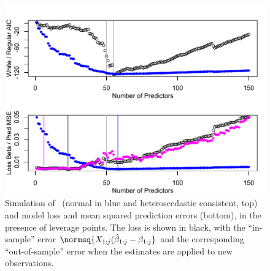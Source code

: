 \documentclass[12pt]{article}
\begin{document}
 \begin{figure}
 \caption{ Simulation of \aic\ (normal in blue and heteroscedastic consistent,
 top) and model loss and mean squared prediction errors (bottom), in the
 presence of leverage points.  The loss is shown in black, with the
 ``in-sample'' error $\normsq{X_{1:j}(\hat\beta_{1:j}-\beta_{1:j}}$ and the
 corresponding ``out-of-sample'' error when the estimates are applied to new
 observations. }
 \label{fig:example1}
  \centerline{ \includegraphics[width=5in]{figures/example1.pdf} }
 \end{figure}
\end{document}
